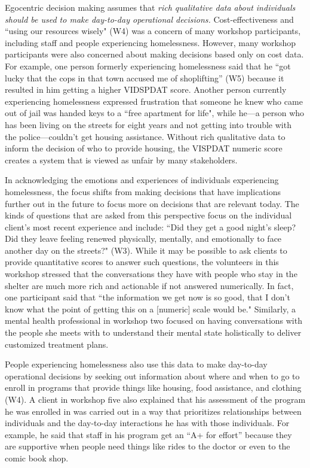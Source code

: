 Egocentric decision making assumes that \textit{rich qualitative data about individuals should be used to make day-to-day operational decisions.} Cost-effectiveness and ``using our resources wisely" (W4) was a concern of many workshop participants, including staff and people experiencing homelessness. However, many workshop participants were also concerned about making decisions based only on cost data. For example, one person formerly experiencing homelessness said that he ``got lucky that the cops in that town accused me of shoplifting'' (W5) because it resulted in him getting a higher VIDSPDAT score. Another person currently experiencing homelessness expressed frustration that someone he knew who came out of jail was handed keys to a ``free apartment for life", while he---a person who has been living on the streets for eight years and not getting into trouble with the police---couldn't get housing assistance. Without rich qualitative data to inform the decision of who to provide housing, the VISPDAT numeric score creates a system that is viewed as unfair by many stakeholders.

In acknowledging the emotions and experiences of individuals experiencing homelessness, the focus shifts from making decisions that have implications further out in the future to focus more on decisions that are relevant today. The kinds of questions that are asked from this perspective focus on the individual client's most recent experience and include: ``Did they get a good night's sleep? Did they leave feeling renewed physically, mentally, and emotionally to face another day on the streets?" (W3). While it may be possible to ask clients to provide quantitative scores to answer such questions, the volunteers in this workshop stressed that the conversations they have with people who stay in the shelter are much more rich and actionable if not answered numerically. In fact, one participant said that ``the information we get now is so good, that I don't know what the point of getting this on a [numeric] scale would be." Similarly, a mental health professional in workshop two focused on having conversations with the people she meets with to understand their mental state holistically to deliver customized treatment plans.

People experiencing homelessness also use this data to make day-to-day operational decisions by seeking out information about where and when to go to enroll in programs that provide things like housing, food assistance, and clothing (W4). A client in workshop five also explained that his assessment of the program he was enrolled in was carried out in a way that prioritizes relationships between individuals and the day-to-day interactions he has with those individuals. For example, he said that staff in his program get an ``A+ for effort'' because they are supportive when people need things like rides to the doctor or even to the comic book shop.

